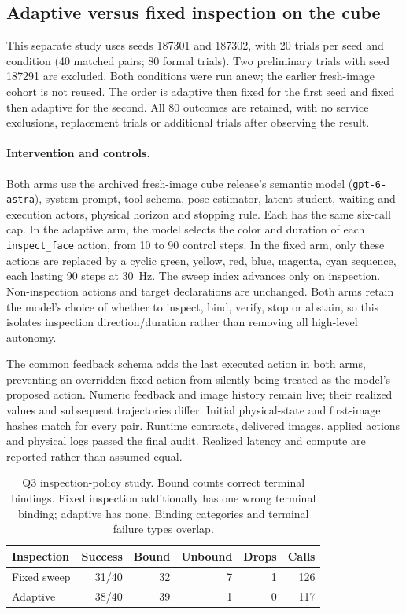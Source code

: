 \subsection{Adaptive versus fixed inspection on the cube}
\label{sec:inspection-policy}
This separate study uses seeds 187301 and 187302, with 20 trials per seed and condition (40 matched pairs; 80 formal trials). Two preliminary trials with seed 187291 are excluded. Both conditions were run anew; the earlier fresh-image cohort is not reused. The order is adaptive then fixed for the first seed and fixed then adaptive for the second. All 80 outcomes are retained, with no service exclusions, replacement trials or additional trials after observing the result.

\paragraph{Intervention and controls.}
Both arms use the archived fresh-image cube release's semantic model (\texttt{gpt-6-astra}), system prompt, tool schema, pose estimator, latent student, waiting and execution actors, physical horizon and stopping rule. Each has the same six-call cap. In the adaptive arm, the model selects the color and duration of each \texttt{inspect\_face} action, from 10 to 90 control steps. In the fixed arm, only these actions are replaced by a cyclic green, yellow, red, blue, magenta, cyan sequence, each lasting 90 steps at 30~Hz. The sweep index advances only on inspection. Non-inspection actions and target declarations are unchanged. Both arms retain the model's choice of whether to inspect, bind, verify, stop or abstain, so this isolates inspection direction/duration rather than removing all high-level autonomy.

The common feedback schema adds the last executed action in both arms, preventing an overridden fixed action from silently being treated as the model's proposed action. Numeric feedback and image history remain live; their realized values and subsequent trajectories differ. Initial physical-state and first-image hashes match for every pair. Runtime contracts, delivered images, applied actions and physical logs passed the final audit. Realized latency and compute are reported rather than assumed equal.

\begin{table}[h]
\centering\small
\setlength{\tabcolsep}{3pt}
\begin{tabular}{lrrrrr}
\toprule
Inspection & Success & Bound & Unbound & Drops & Calls\\
\midrule
Fixed sweep & 31/40 & 32 & 7 & 1 & 126\\
Adaptive & 38/40 & 39 & 1 & 0 & 117\\
\bottomrule
\end{tabular}
\caption{Q3 inspection-policy study. Bound counts correct terminal bindings. Fixed inspection additionally has one wrong terminal binding; adaptive has none. Binding categories and terminal failure types overlap.}
\label{tab:inspection-policy-supp}
\end{table}

